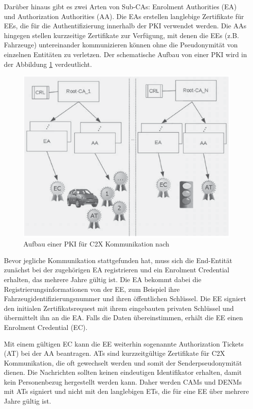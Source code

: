 Darüber hinaus gibt es zwei Arten von Sub-CAs: Enrolment Authorities (EA) und Authorization Authorities (AA). Die EAs erstellen langlebige Zertifikate für EEs, die für die Authentifizierung innerhalb der PKI verwendet werden. Die AAs hingegen stellen kurzzeitige Zertifikate zur Verfügung, mit denen die EEs (z.B. Fahrzeuge) untereinander kommunizieren können ohne die Pseudonymität von einzelnen Entitäten zu verletzen. Der schematische Aufbau von einer PKI wird in der Abbildung \ref{fig:pki} verdeutlicht.

\begin{figure}
	\centering
	\includegraphics[width=0.7\linewidth]{images/PKI}
	\caption{Aufbau einer PKI für C2X Kommunikation nach \cite{Strubbe2017}}
	\label{fig:pki}
\end{figure}

Bevor jegliche Kommunikation stattgefunden hat, muss sich die End-Entität zunächst bei der zugehörigen EA registrieren und ein Enrolment Credential erhalten, das mehrere Jahre gültig ist. Die EA bekommt dabei die Registrierungsinformationen von der EE, zum Beispiel ihre Fahrzeugidentifizierungsnummer und ihren öffentlichen Schlüssel. Die EE signiert den initialen Zertifikatsrequest mit ihrem eingebauten privaten Schlüssel und übermittelt ihn an die EA. Falls die Daten übereinstimmen, erhält die EE einen Enrolment Credential (EC).

Mit einem gültigen EC kann die EE weiterhin sogenannte Authorization Tickets (AT) bei der AA beantragen. ATs sind kurzzeitgültige Zertifikate für C2X Kommunikation, die oft gewechselt werden und somit der Senderpseudonymität dienen. Die Nachrichten sollten keinen eindeutigen Identifikator erhalten, damit kein Personenbezug hergestellt werden kann. Daher werden CAMs und DENMs mit ATs signiert und nicht mit den langlebigen ETs, die für eine EE über mehrere Jahre gültig ist. 

